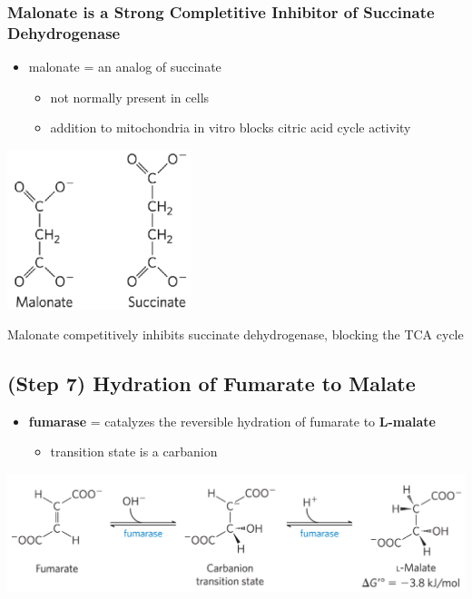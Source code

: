 \documentclass[10pt]{article}
\begin{document}
\subsubsection*{Malonate is a Strong Completitive Inhibitor of Succinate Dehydrogenase}
\begin{itemize}
	\item malonate = an analog of succinate
	\begin{itemize}
        \item not normally present in cells
        \item addition to mitochondria in vitro blocks citric acid cycle activity
    \end{itemize}
\end{itemize}
\begin{center} 
	\includegraphics*[width=0.4\textwidth]{L4_17.png} 
\end{center}
Malonate competitively inhibits succinate dehydrogenase, blocking the TCA cycle

\subsection*{(Step 7) Hydration of Fumarate to Malate}
\begin{itemize}
	\item \textbf{fumarase} = catalyzes the reversible hydration of fumarate to \textbf{L-malate}
	\begin{itemize}
        \item transition state is a carbanion
    \end{itemize}
\end{itemize}
\begin{center} 
	\includegraphics*[width=\textwidth]{L4_18.png} 
\end{center}
\end{document}

